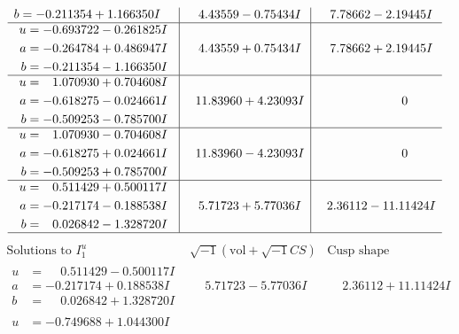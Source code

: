 \documentclass[1p]{elsarticle_modified}
\theoremstyle{definition}
\newcommand{\I}{\sqrt{-1}}
\begin{document}
$$\begin{array}{c|c|c}
\begin{aligned}
b &= -0.211354 + 1.166350 I\end{aligned}
 & \phantom{-}4.43559 - 0.75434 I & \phantom{-}7.78662 - 2.19445 I \\ \hline\begin{aligned}
u &= -0.693722 - 0.261825 I \\
a &= -0.264784 + 0.486947 I \\
b &= -0.211354 - 1.166350 I\end{aligned}
 & \phantom{-}4.43559 + 0.75434 I & \phantom{-}7.78662 + 2.19445 I \\ \hline\begin{aligned}
u &= \phantom{-}1.070930 + 0.704608 I \\
a &= -0.618275 - 0.024661 I \\
b &= -0.509253 - 0.785700 I\end{aligned}
 & \phantom{-}11.83960 + 4.23093 I & \phantom{-0.000000 } 0 \\ \hline\begin{aligned}
u &= \phantom{-}1.070930 - 0.704608 I \\
a &= -0.618275 + 0.024661 I \\
b &= -0.509253 + 0.785700 I\end{aligned}
 & \phantom{-}11.83960 - 4.23093 I & \phantom{-0.000000 } 0 \\ \hline\begin{aligned}
u &= \phantom{-}0.511429 + 0.500117 I \\
a &= -0.217174 - 0.188538 I \\
b &= \phantom{-}0.026842 - 1.328720 I\end{aligned}
 & \phantom{-}5.71723 + 5.77036 I & \phantom{-}2.36112 - 11.11424 I\\
 \hline 
 \end{array}$$\newpage$$\begin{array}{c|c|c}  
\text{Solutions to }I^u_{1}& \I (\text{vol} + \sqrt{-1}CS) & \text{Cusp shape}\\
 \hline 
\begin{aligned}
u &= \phantom{-}0.511429 - 0.500117 I \\
a &= -0.217174 + 0.188538 I \\
b &= \phantom{-}0.026842 + 1.328720 I\end{aligned}
 & \phantom{-}5.71723 - 5.77036 I & \phantom{-}2.36112 + 11.11424 I \\ \hline\begin{aligned}
u &= -0.749688 + 1.044300 I \\

\end{aligned}
\end{array}$$
\end{document}
